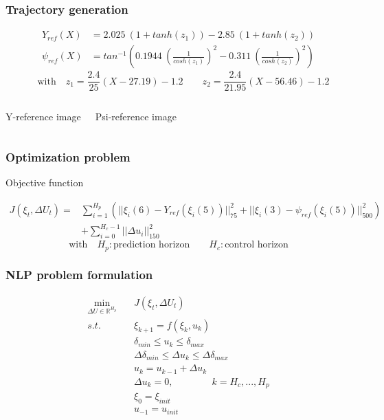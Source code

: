 \documentclass{beamer}
\begin{document}
\begin{frame}
\frametitle{Trajectory generation}

\begin{align*}
Y_{ref}(X) &= 2.025 \ (1 + tanh(z_1)) - 2.85 \ (1 + tanh(z_2)) \\
\psi_{ref}(X) &= tan^{-1} \left( 0.1944 \ \left(\frac{1}{cosh(z_1)}\right)^2 - 0.311 \ \left(\frac{1}{cosh(z_2)}\right)^2 \right)
\end{align*}
\[\quad \text{with} \quad z_1 = \frac{2.4}{25}(X - 27.19) - 1.2 \qquad z_2 =
\frac{2.4}{21.95}(X - 56.46) - 1.2 \]


\begin{columns}[t,onlytextwidth]
Y-reference image

Psi-reference image

\end{columns}

\end{frame}






\begin{frame}
\frametitle{Optimization problem}

\begin{block}{Objective function}


\begin{align*}
J(\xi_t, \Delta U_t) = &\sum_{i=1}^{H_p} \left( ||\xi_i(6) - Y_{ref}(\xi_i(5)) ||_{75}^2 + ||\xi_i(3) - \psi_{ref}(\xi_i(5)) ||_{500}^2 \right) \\
&+ \sum_{i=0}^{H_c-1} || \Delta u_i ||_{150}^2
\end{align*}
\[\text{with} \quad H_p : \text{prediction horizon} \qquad H_c : \text{control
horizon}\]


\end{block}

\end{frame}







\begin{frame}
\frametitle{NLP problem formulation}

\begin{align*}
\min_{\Delta U \in \mathbb{R}^{H_p}} \quad &J(\xi_t, \Delta U_t) \\
s.t. \qquad &\xi_{k+1} = f(\xi_k, u_k) \\
&\delta_{min} \leq u_k \leq \delta_{max} \\
&\Delta \delta_{min} \leq \Delta u_k \leq \Delta \delta_{max} \\
&u_k = u_{k-1} + \Delta u_k \\
&\Delta u_k = 0, \qquad \qquad k = H_c, . . . , H_p \\
&\xi_0 = \xi_{init} \\
& u_{-1} = u_{init}
\end{align*}

\end{frame}
\end{document}
